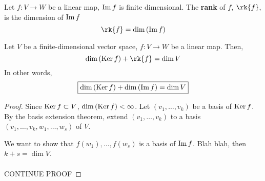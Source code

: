 \documentclass[letterpaper,12pt]{article}
\begin{document}
\begin{definition}
Let $f: V \rightarrow W$ be a linear map, $\operatorname{Im}{f}$ is finite dimensional. The \textbf{rank} of $f$, $\rk{f}$, is the dimension of $\operatorname{Im}{f}$
\begin{equation*}
    \rk{f} = \dim{(\Image{f})}
\end{equation*}
\end{definition}

\begin{theorem}
Let $V$ be a finite-dimensional vector space, $f: V \rightarrow W$ be a linear map. Then,
\begin{equation*}
    \dim{(\Ker{f})} + \rk{f} = \dim{V}
\end{equation*}
In other words,
\begin{equation*}
    \boxed{\dim{(\operatorname{Ker}{f})} + \dim{(\operatorname{Im}{f})} = \dim{V}}
\end{equation*}
\end{theorem}
\begin{proof}
Since $\operatorname{Ker}{f} \subset V$, $\dim{(\operatorname{Ker}{f})} < \infty$. Let $(v_1, \dots, v_k)$ be a basis of $\operatorname{Ker}{f}$. By the basis extension theorem, extend $(v_1, \dots, v_k)$ to a basis $(v_1, \dots, v_k, w_1, \dots, w_s)$ of $V$.

We want to show that $f(w_1), \dots, f(w_s)$ is a basis of $\operatorname{Im}{f}$. Blah blah, then $k + s = \dim{V}$.
\\ \\ CONTINUE PROOF

\end{proof}
\end{document}
